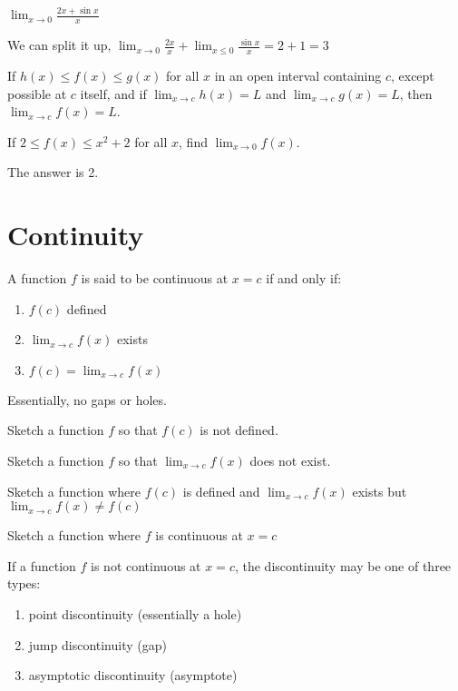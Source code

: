 \documentclass[../bccalc.tex]{subfiles}
\begin{document}
\begin{example}
    $\lim_{x\to 0}\frac{2x+\sin x}{x}$

    We can split it up, $\lim_{x\to 0}\frac{2x}{x}+\lim_{x\leq 0}\frac{\sin x}{x}=2+1=3$
\end{example}

\begin{theorem}
    If $h(x)\leq f(x)\leq g(x)$ for all $x$ in an open interval containing $c$, except possible at $c$ itself, and if $\lim_{x\to c}h(x)=L$ and $\lim_{x\to c}g(x)=L$, then $\lim_{x\to c}f(x)=L$.
\end{theorem}

\begin{example}
    If $2\leq f(x)\leq x^2+2$ for all $x$, find $\lim_{x\to 0}f(x)$.

    The answer is 2.
\end{example}

\section{Continuity}
\begin{definition}[Continuity]
    A function $f$ is said to be continuous at $x=c$ if and only if:
    \begin{enumerate}
        \item $f(c)$ defined 
        \item $\lim_{x\to c}f(x)$ exists 
        \item $f(c)=\lim_{x\to c}f(x)$
    \end{enumerate}

    Essentially, no gaps or holes.
\end{definition}

\ex Sketch a function $f$ so that $f(c)$ is not defined. 

\ex Sketch a function $f$ so that $\lim_{x\to c}f(x)$ does not exist.

\ex Sketch a function where $f(c)$ is defined and $\lim_{x\to c}f(x)$ exists but $\lim_{x\to c}f(x)\neq f(c)$

\ex Sketch a function where $f$ is continuous at $x=c$

If a function $f$ is not continuous at $x=c$, the discontinuity may be one of three types:
\begin{enumerate}
    \item point discontinuity (essentially a hole)
    \item jump discontinuity (gap)
    \item asymptotic discontinuity (asymptote)
\end{enumerate}
\end{document}
